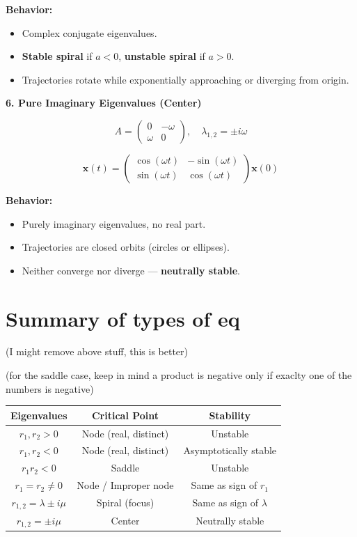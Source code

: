 \documentclass{report}
\begin{document}
\textbf{Behavior:}
\begin{itemize}
  \item Complex conjugate eigenvalues.
  \item \textbf{Stable spiral} if $a < 0$, \textbf{unstable spiral} if $a > 0$.
  \item Trajectories rotate while exponentially approaching or diverging from origin.
\end{itemize}

\textbf{6. Pure Imaginary Eigenvalues (Center)}

\[
A =
\begin{pmatrix}
0 & -\omega\\
\omega & 0
\end{pmatrix}, \quad
\lambda_{1,2} = \pm i\omega
\]

\[
\mathbf{x}(t) =
\begin{pmatrix}
\cos(\omega t) & -\sin(\omega t)\\
\sin(\omega t) & \cos(\omega t)
\end{pmatrix}
\mathbf{x}(0)
\]

\textbf{Behavior:}
\begin{itemize}
  \item Purely imaginary eigenvalues, no real part.
  \item Trajectories are closed orbits (circles or ellipses).
  \item Neither converge nor diverge — \textbf{neutrally stable}.
\end{itemize}

\section*{Summary of types of eq} 
(I might remove above stuff, this is better)

(for the saddle case, keep in mind a product is negative only 
if exaclty one of the numbers is negative) 

\renewcommand{\arraystretch}{1.1} %
\begin{tabular}{|c|c|c|}
\hline
\textbf{Eigenvalues} & \textbf{Critical Point} & \textbf{Stability} \\
\hline
$r_1, r_2 > 0$ & Node (real, distinct) & Unstable \\
$r_1, r_2 < 0$ & Node (real, distinct) & Asymptotically stable \\
$r_1 r_2 < 0$ & Saddle & Unstable \\
$r_1 = r_2 \neq 0$ & Node / Improper node & Same as sign of $r_1$ \\
$r_{1,2} = \lambda \pm i\mu$ & Spiral (focus) & Same as sign of $\lambda$ \\
$r_{1,2} = \pm i\mu$ & Center & Neutrally stable \\
\hline
\end{tabular}
\end{document}
